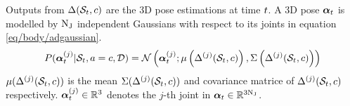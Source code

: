 Outputs from $\Delta(\mathcal{S}_{t}, c)$ are the 3D pose estimations at time $t$. A 3D pose $\boldsymbol{\alpha}_{t}$ is modelled by $\mathrm{N_{J}}$ independent Gaussians with respect to its joints in equation \ref{eq/body/adgaussian}. 
\begin{equation} 
	\label{eq/body/adgaussian}
	P( \boldsymbol{\alpha}^{(j)}_{t}| \mathcal{S}_{t}, a = c,\mathcal{D}) =
	\mathcal{N}\left(\boldsymbol{\alpha}^{(j)}_{t}; \mu\left(\Delta^{(j)}(\mathcal{S}_{t},c)\right), \Sigma\left(\Delta^{(j)}(\mathcal{S}_{t},c)\right)\right) 
\end{equation}
$\mu(\Delta^{(j)}(\mathcal{S}_{t},c))$ is the mean $\Sigma(\Delta^{(j)}(\mathcal{S}_{t},c))$ and covariance matrice of $\Delta^{(j)}(\mathcal{S}_{t},c)$ respectively.  $\boldsymbol{\alpha}_{t}^{(j)}\in\mathbb{R}^{3}$ denotes the $j$-th joint in $\boldsymbol{\alpha}_{t}\in\mathbb{R}^{3\mathrm{N_{J}}}$.

